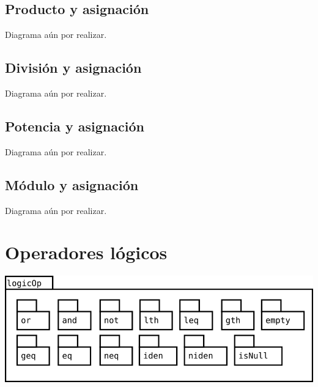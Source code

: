 \subsection {Producto y asignación}
Diagrama aún por realizar.

\subsection {División y asignación}
Diagrama aún por realizar.

\subsection {Potencia y asignación}
Diagrama aún por realizar.

\subsection {Módulo y asignación}
Diagrama aún por realizar.
\pagebreak
\section {Operadores lógicos}
\begin{center}
\includegraphics[scale=0.4]{logicOp-package.png} \\
\end{center}

